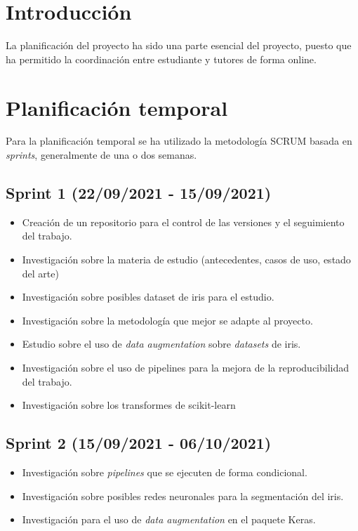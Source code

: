 
\section{Introducción}

La planificación del proyecto ha sido una parte esencial del proyecto, puesto que ha permitido la coordinación entre estudiante y tutores de forma online.

\section{Planificación temporal}

Para la planificación temporal se ha utilizado la metodología SCRUM basada en \textit{sprints}, generalmente de una o dos semanas.

\subsection{Sprint 1 (22/09/2021 - 15/09/2021)}

\begin{itemize}
\item Creación de un repositorio para el control de las versiones y el seguimiento del trabajo.
\item Investigación sobre la materia de estudio (antecedentes, casos de uso, estado del arte)
\item Investigación sobre posibles dataset de iris para el estudio.
\item Investigación sobre la metodología que mejor se adapte al proyecto.
\item Estudio sobre el uso de \textit{data augmentation} sobre \textit{datasets} de iris.
\item Investigación sobre el uso de pipelines para la mejora de la reproducibilidad del trabajo.
\item Investigación sobre los transformes de scikit-learn
\end{itemize}

\subsection{Sprint 2 (15/09/2021 - 06/10/2021)}

\begin{itemize}
\item Investigación sobre \textit{pipelines} que se ejecuten de forma condicional.
\item Investigación sobre posibles redes neuronales para la segmentación del iris.
\item Investigación para el uso de \textit{data augmentation} en el paquete Keras.
\end{itemize}

